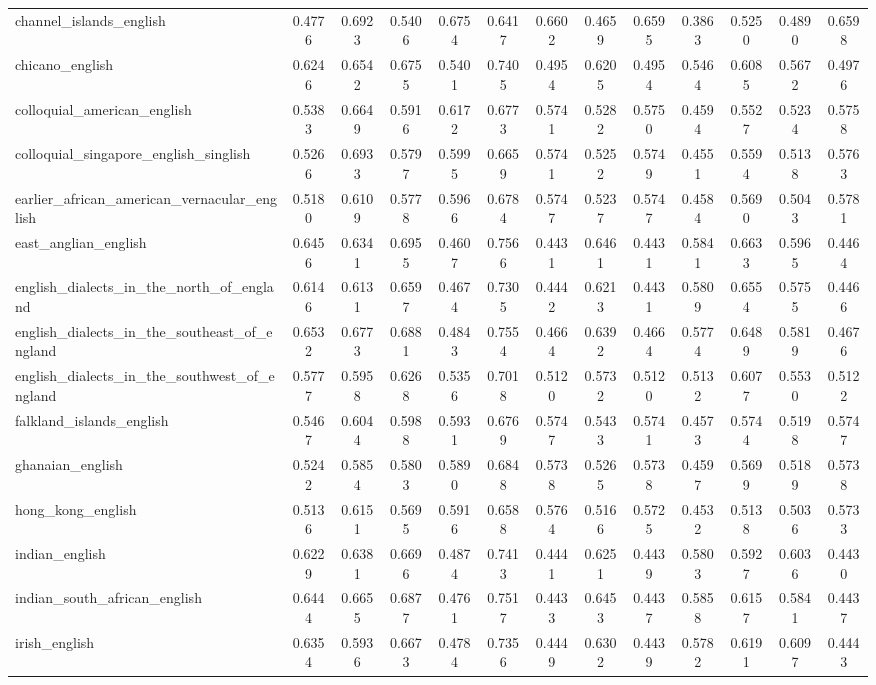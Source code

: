 \begin{landscape}
\begin{longtable}{lcccccccccccc}
channel\_islands\_english & 0.4776 & 0.6923 & 0.5406 & 0.6754 & 0.6417 & 0.6602 & 0.4659 & 0.6595 & 0.3863 & 0.5250 & 0.4890 & 0.6598 \\
chicano\_english & 0.6246 & 0.6542 & 0.6755 & 0.5401 & 0.7405 & 0.4954 & 0.6205 & 0.4954 & 0.5464 & 0.6085 & 0.5672 & 0.4976 \\
colloquial\_american\_english & 0.5383 & 0.6649 & 0.5916 & 0.6172 & 0.6773 & 0.5741 & 0.5282 & 0.5750 & 0.4594 & 0.5527 & 0.5234 & 0.5758 \\
colloquial\_singapore\_english\_singlish & 0.5266 & 0.6933 & 0.5797 & 0.5995 & 0.6659 & 0.5741 & 0.5252 & 0.5749 & 0.4551 & 0.5594 & 0.5138 & 0.5763 \\
earlier\_african\_american\_vernacular\_english & 0.5180 & 0.6109 & 0.5778 & 0.5966 & 0.6784 & 0.5747 & 0.5237 & 0.5747 & 0.4584 & 0.5690 & 0.5043 & 0.5781 \\
east\_anglian\_english & 0.6456 & 0.6341 & 0.6955 & 0.4607 & 0.7566 & 0.4431 & 0.6461 & 0.4431 & 0.5841 & 0.6633 & 0.5965 & 0.4464 \\
english\_dialects\_in\_the\_north\_of\_england & 0.6146 & 0.6131 & 0.6597 & 0.4674 & 0.7305 & 0.4442 & 0.6213 & 0.4431 & 0.5809 & 0.6554 & 0.5755 & 0.4466 \\
english\_dialects\_in\_the\_southeast\_of\_england & 0.6532 & 0.6773 & 0.6881 & 0.4843 & 0.7554 & 0.4664 & 0.6392 & 0.4664 & 0.5774 & 0.6489 & 0.5819 & 0.4676 \\
english\_dialects\_in\_the\_southwest\_of\_england & 0.5777 & 0.5958 & 0.6268 & 0.5356 & 0.7018 & 0.5120 & 0.5732 & 0.5120 & 0.5132 & 0.6077 & 0.5530 & 0.5122 \\
falkland\_islands\_english & 0.5467 & 0.6044 & 0.5988 & 0.5931 & 0.6769 & 0.5747 & 0.5433 & 0.5741 & 0.4573 & 0.5744 & 0.5198 & 0.5747 \\
ghanaian\_english & 0.5242 & 0.5854 & 0.5803 & 0.5890 & 0.6848 & 0.5738 & 0.5265 & 0.5738 & 0.4597 & 0.5699 & 0.5189 & 0.5738 \\
hong\_kong\_english & 0.5136 & 0.6151 & 0.5695 & 0.5916 & 0.6588 & 0.5764 & 0.5166 & 0.5725 & 0.4532 & 0.5138 & 0.5036 & 0.5733 \\
indian\_english & 0.6229 & 0.6381 & 0.6696 & 0.4874 & 0.7413 & 0.4441 & 0.6251 & 0.4439 & 0.5803 & 0.5927 & 0.6036 & 0.4430 \\
indian\_south\_african\_english & 0.6444 & 0.6655 & 0.6877 & 0.4761 & 0.7517 & 0.4433 & 0.6453 & 0.4437 & 0.5858 & 0.6157 & 0.5841 & 0.4437 \\
irish\_english & 0.6354 & 0.5936 & 0.6673 & 0.4784 & 0.7356 & 0.4449 & 0.6302 & 0.4439 & 0.5782 & 0.6191 & 0.6097 & 0.4443 \\

\end{longtable}
\end{landscape}
